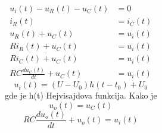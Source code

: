 \begin{frame}[label=08-s044]
\setlength{\parskip}{2pt}
\setlength{\abovedisplayskip}{4pt}\setlength{\belowdisplayskip}{4pt}
\gusttekst
\begin{columns}[c,onlytextwidth]\centering
{}
\begin{align*}
u_i(t)-u_R(t)-u_C(t)&=0\\
i_R(t)&=i_C(t)\\[5pt]
u_R(t)+u_C(t)&=u_i(t)\\
Ri_R(t)+u_C(t)&=u_i(t)\\
Ri_C(t)+u_C(t)&=u_i(t)\\
RC\frac{du_C(t)}{dt}+u_C(t)&=u_i(t)
\end{align*}
\[u_i(t)=(U-U_0)h(t-t_0)+U_0\]
gde je h(t) Hejvisajdova funkcija. Kako je
\[u_o(t)=u_C(t)\]
\[RC\frac{du_o(t)}{dt}+u_o(t)=u_i(t)\]
\end{columns}
\end{frame}
